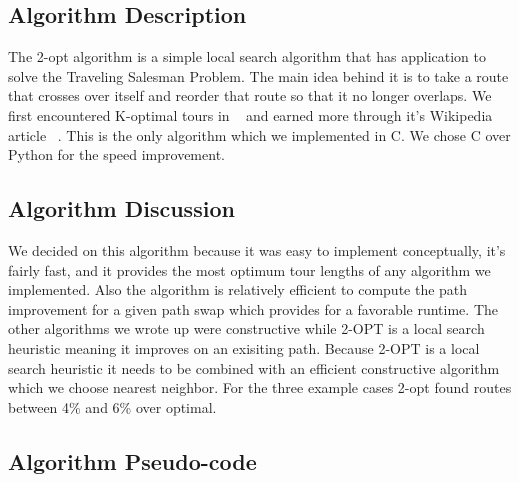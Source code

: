\documentclass[../report/main.tex]{subfiles}
\begin{document}
\subsection*{Algorithm Description}

The 2-opt algorithm is a simple local search algorithm that has application to solve the Traveling Salesman Problem. The main idea behind it is to take a route that crosses over itself and reorder that route so that it no longer overlaps. We first encountered K-optimal tours in ~\cite{skiena_2008} and earned more through it's Wikipedia article ~\cite{wikipedia_2opt}.  This is the only algorithm which we implemented in C.  We chose C over Python for the speed improvement.

\subsection*{Algorithm Discussion}

We decided on this algorithm because it was easy to implement conceptually, it's fairly fast, and it provides the most optimum tour lengths of any algorithm we implemented. Also the algorithm is relatively efficient to compute the path improvement for a given path swap which provides for a favorable runtime. The other algorithms we wrote up were constructive while 2-OPT is a local search heuristic meaning it improves on an exisiting path.  Because 2-OPT is a local search heuristic it needs to be combined with an efficient constructive algorithm which we choose nearest neighbor.  For the three example cases 2-opt found routes between 4\% and 6\% over optimal.

\subsection*{Algorithm Pseudo-code}
\end{document}
